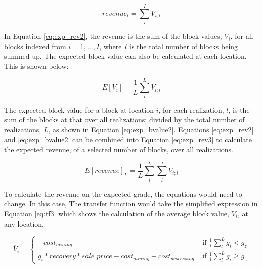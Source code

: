     \begin{equation}
        revenue_{l} = \sum_{i}^{I}  V_{i;l}
        \label{eq:exp_rev2}
    \end{equation}

    In Equation \ref{eq:exp_rev2}, the revenue is the sum of the block values, $V_i$, for all blocks indexed from $i = 1,...,I$, where $I$ is the total number of blocks being summed up. The expected block value can also be calculated at each location. This is shown below:

    \begin{equation}
        E\left [ V_i \right ] = \frac{1}{L} \sum_{l}^{L} V_{l;i}
        \label{eq:exp_bvalue2}
    \end{equation}

    The expected block value for a block at location $i$, for each realization, $l$, is the sum of the blocks at that over all realizations; divided by the total number of realizations, $L$, as shown in Equation \ref{eq:exp_bvalue2}. Equations \ref{eq:exp_rev2} and \ref{eq:exp_bvalue2} can be combined into Equation \ref{eq:exp_rev3} to calculate the expected revenue, of a selected number of blocks, over all realizations.

    \begin{equation}
        E\left [ revenue \right ]_{L} = \frac{1}{L}\sum_{l}^{L}\sum_{i}^{I} V_{i;l}
        \label{eq:exp_rev3}
    \end{equation}

    To calculate the revenue on the expected grade, the equations would need to change. In this case, The transfer function would take the simplified expression in Equation \ref{eq:tf3} which shows the calculation of the average block value, $\overline{V}_i$, at any location.

    \begin{equation} %
        \overline{V}_i =\begin{cases}
        -cost_{mining} & \text{ if }  \frac{1}{l} \sum_{l}^{L} g_{i} < g_z \\
        g_i*recovery*sale\_price - cost_{mining} - cost_{processing} & \text{ if }  \frac{1}{l} \sum_{l}^{L} g_{i}\geq g_z
        \end{cases}
        \label{eq:tf3}
    \end{equation}

